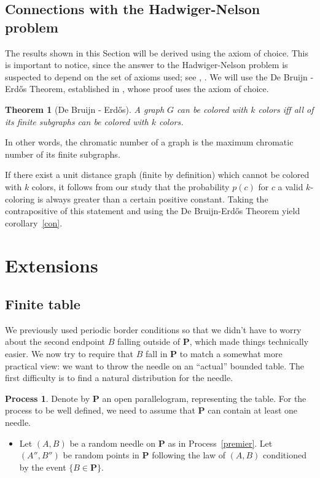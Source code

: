 \documentclass[a4paper,11pt]{article}
\newtheorem{theo}{Theorem}
\theoremstyle{definition}
\newtheorem{process}{Process}
\theoremstyle{remark}
\renewcommand{\P}{\mathbf{P}}
\begin{document}
\subsection{Connections with the Hadwiger-Nelson problem} \label{hn}
The results shown in this Section will be derived using the axiom of choice. 
This is important to notice, since the answer to the Hadwiger-Nelson problem is 
suspected to depend on the set of axioms used; see \cite{choice}, \cite{choice2}. We will use the 
De Bruijn - Erd\H{o}s Theorem, established in \cite{erdos}, whose proof uses 
the axiom of choice.
\begin{theo}[De Bruijn - Erd\H{o}s]
 A graph $G$ can be colored with $k$ colors iff all of its finite subgraphs 
 can be colored with $k$ colors.
\end{theo}
In other words, the chromatic number of a graph is the maximum chromatic number 
of its finite subgraphs.

If there exist a unit distance graph (finite by definition) which cannot 
be colored with $k$ colors, it 
follows from our study that the probability $p(c)$ for $c$ a valid 
$k$-coloring is always greater than a certain positive constant. Taking the 
contrapositive of this statement and using the De Bruijn-Erd\H{o}s Theorem yield 
corollary~\ref{con}.

\section{Extensions}
\label{ext}
\subsection{Finite table}
\label{fini}

We previously used periodic border conditions so that we didn't have to worry about the second 
endpoint $B$ falling outside of $\mathbf{P}$, which made things technically easier. We now 
try to require that $B$ fall in $\mathbf{P}$ to match a somewhat more practical 
view: we want to throw the needle on an ``actual'' bounded 
table. The first difficulty is to find a natural distribution for the needle.

\begin{process} \label{encore}
Denote by $\mathbf{P}$ an open parallelogram, representing the table. For the 
process to be well defined, we need to assume that $\mathbf{P}$ can contain at
least one needle.
\begin{itemize}
\item Let $(A,B)$ be a random needle on $\P$ as in Process~\ref{premier}. Let $(A'',B'')$ be random points in $\P$ following the law
of $(A,B)$ conditioned by the event $\{B \in \mathbf{P} \}$.
\end{itemize}
\end{process}
\end{document}
